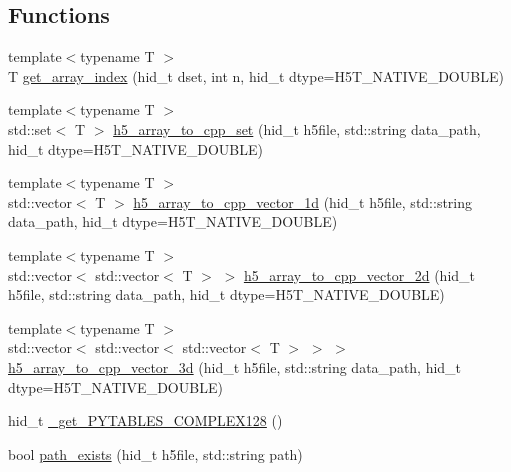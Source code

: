 \subsection*{Functions}
\begin{DoxyCompactItemize}
\item 
{\footnotesize template$<$typename T $>$ }\\T \hyperlink{namespaceh5wrap_aa1fe2dffc1fcbde11e7ceaf3fcc57cfd}{get\+\_\+array\+\_\+index} (hid\+\_\+t dset, int n, hid\+\_\+t dtype=H5\+T\+\_\+\+N\+A\+T\+I\+V\+E\+\_\+\+D\+O\+U\+B\+LE)
\item 
{\footnotesize template$<$typename T $>$ }\\std\+::set$<$ T $>$ \hyperlink{namespaceh5wrap_ab8c97f180ec4885c15b275a41447912f}{h5\+\_\+array\+\_\+to\+\_\+cpp\+\_\+set} (hid\+\_\+t h5file, std\+::string data\+\_\+path, hid\+\_\+t dtype=H5\+T\+\_\+\+N\+A\+T\+I\+V\+E\+\_\+\+D\+O\+U\+B\+LE)
\item 
{\footnotesize template$<$typename T $>$ }\\std\+::vector$<$ T $>$ \hyperlink{namespaceh5wrap_ab927484b5e446d3325d8fc88b00f3e85}{h5\+\_\+array\+\_\+to\+\_\+cpp\+\_\+vector\+\_\+1d} (hid\+\_\+t h5file, std\+::string data\+\_\+path, hid\+\_\+t dtype=H5\+T\+\_\+\+N\+A\+T\+I\+V\+E\+\_\+\+D\+O\+U\+B\+LE)
\item 
{\footnotesize template$<$typename T $>$ }\\std\+::vector$<$ std\+::vector$<$ T $>$ $>$ \hyperlink{namespaceh5wrap_a0cc2fdb859631d95b9fe1dd85954f359}{h5\+\_\+array\+\_\+to\+\_\+cpp\+\_\+vector\+\_\+2d} (hid\+\_\+t h5file, std\+::string data\+\_\+path, hid\+\_\+t dtype=H5\+T\+\_\+\+N\+A\+T\+I\+V\+E\+\_\+\+D\+O\+U\+B\+LE)
\item 
{\footnotesize template$<$typename T $>$ }\\std\+::vector$<$ std\+::vector$<$ std\+::vector$<$ T $>$ $>$ $>$ \hyperlink{namespaceh5wrap_a30f0c9d34b6e369db5807362b8e1c1be}{h5\+\_\+array\+\_\+to\+\_\+cpp\+\_\+vector\+\_\+3d} (hid\+\_\+t h5file, std\+::string data\+\_\+path, hid\+\_\+t dtype=H5\+T\+\_\+\+N\+A\+T\+I\+V\+E\+\_\+\+D\+O\+U\+B\+LE)
\item 
hid\+\_\+t \hyperlink{namespaceh5wrap_a2ddc38d8445aba6996a31fc0dde6b7bf}{\+\_\+get\+\_\+\+P\+Y\+T\+A\+B\+L\+E\+S\+\_\+\+C\+O\+M\+P\+L\+E\+X128} ()
\item 
bool \hyperlink{namespaceh5wrap_ae8e8e2bdbaffb31ee8066260d3c68518}{path\+\_\+exists} (hid\+\_\+t h5file, std\+::string path)
\end{DoxyCompactItemize}


